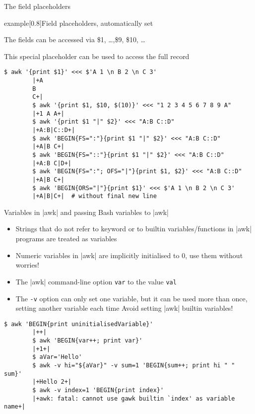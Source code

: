 \begin{frame}[fragile]{The field placeholders}
    \vspace{-4mm}
    \begin{varblock}{example}[0.8\textwidth]{Field placeholders, automatically set}
        \begin{description}[XXXXXX]
            \item[\$n] The fields can be accessed via \$1, \ldots,\$9, \$10, \ldots
            \item[\$0] This special placeholder can be used to access the full record
        \end{description}
    \end{varblock}
    \begin{lstlisting}[style=MyBash]
        $ awk '{print $1}' <<< $'A 1 \n B 2 \n C 3'
        |+A
        B
        C+|
        $ awk '{print $1, $10, $(10)}' <<< "1 2 3 4 5 6 7 8 9 A"
        |+1 A A+|
        $ awk '{print $1 "|" $2}' <<< "A:B C::D"
        |+A:B|C::D+|
        $ awk 'BEGIN{FS=":"}{print $1 "|" $2}' <<< "A:B C::D"
        |+A|B C+|
        $ awk 'BEGIN{FS="::"}{print $1 "|" $2}' <<< "A:B C::D"
        |+A:B C|D+|
        $ awk 'BEGIN{FS=":"; OFS="|"}{print $1, $2}' <<< "A:B C::D"
        |+A|B C+|
        $ awk 'BEGIN{ORS="|"}{print $1}' <<< $'A 1 \n B 2 \n C 3'
        |+A|B|C+|  # without final new line
    \end{lstlisting}
\end{frame}
\begin{frame}[fragile]{Variables in \bash|awk| and passing Bash variables to \bash|awk|}
    \vspace{-3mm}
    \begin{itemize}
        \item Strings that do not refer to keyword or to builtin variables/functions in \bash|awk| programs are treated as variables
        \item \alert{Numeric variables in \bash|awk| are implicitly initialised to 0, use them without worries!}
        \item The \bash|awk| command-line option  \texttt{var} to the value \texttt{val} 
        \item The \texttt{-v} option can only set one variable, but it can be used more than once, setting another variable each time
              \alert{Avoid setting \bash|awk| builtin variables!}
    \end{itemize}
    \begin{lstlisting}[style=MyBash, xleftmargin=2mm, xrightmargin=2mm]
        $ awk 'BEGIN{print uninitialisedVariable}'
        |++|
        $ awk 'BEGIN{var++; print var}'
        |+1+|
        $ aVar='Hello'
        $ awk -v hi="${aVar}" -v sum=1 'BEGIN{sum++; print hi " " sum}'
        |+Hello 2+|
        $ awk -v index=1 'BEGIN{print index}'
        |+awk: fatal: cannot use gawk builtin `index' as variable name+|
    \end{lstlisting}
\end{frame}
